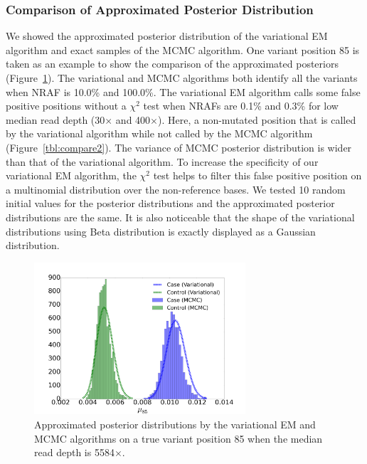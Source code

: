 \documentclass[11pt,reqno]{amsart}
\begin{document}
\subsubsection{Comparison of Approximated Posterior Distribution}
We showed the approximated posterior distribution of the variational EM algorithm and exact samples of the MCMC algorithm.
One variant position 85 is taken as an example to show the comparison of the approximated posteriors (Figure~\ref{tbl:compare1}).
The variational and MCMC algorithms both identify all the variants when NRAF is 10.0\% and 100.0\%.
The variational EM algorithm calls some false positive positions without a $\chi^2$ test when NRAFs are 0.1\% and 0.3\% for low median read depth (30$\times$ and 400$\times$).
Here, a non-mutated position that is called by the variational algorithm while not called by the MCMC algorithm (Figure~\ref{tbl:compare2}).
The variance of MCMC posterior distribution is wider than that of the variational algorithm.
To increase the specificity of our variational EM algorithm, the $\chi^2$ test helps to filter this false positive position on a multinomial distribution over the non-reference bases.
We tested 10 random initial values for the posterior distributions and the approximated posterior distributions are the same.
It is also noticeable that the shape of the variational distributions using Beta distribution is exactly displayed as a Gaussian distribution.
\begin{figure}[htbp]
\centering
\includegraphics[width=0.7\textwidth]{figs/position_85_5584_mcmc_vs_var_mu_fig1.png}
\caption{Approximated posterior distributions by the variational EM and MCMC algorithms on a true variant position 85 when the median read depth is 5584$\times$.}
\label{tbl:compare1}
\end{figure}
\end{document}
